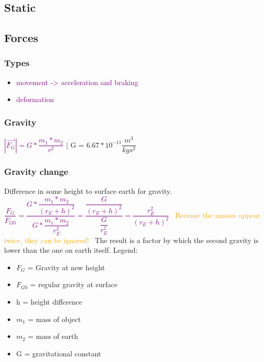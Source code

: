 \documentclass[main.tex,fontsize=8pt,paper=a4,paper=portrait,DIV=calc,]{scrartcl}
\begin{document}
\begin{multicols*}{2}
\section{Static}
\subsection{Forces}
\subsubsection{Types}
\vspace{2mm}
\begin{itemize}
\item \textcolor{purple}{movement -> acceleration and braking}
\item \textcolor{purple}{deformation}

\end{itemize}

\subsubsection{Gravity}
\textcolor{purple}{\( |\vec{F_G}| = G * \dfrac{m_1 * m_2}{r^2} \)} | 
G = \(6.67 * 10^{-11}\dfrac{m^3}{kgs^2}\)\vspace{2mm}

\subsubsection{Gravity change}
Difference in some height to surface earth for gravity.\newline
\, \newline
\large \textcolor{purple}{\( \dfrac{F_G}{F_{G0}} = \dfrac{G*\dfrac{m_1 * m_2}{(r_E + h)^2}}{G*\dfrac{m_1 * m_2}{r_E^2}} = \dfrac{\dfrac{G}{(r_E + h)^2}}{\dfrac{G}{r_E^2}}  = \dfrac{r_E^2}{(r_E + h)^2} \)}\newline
\, \newline
\textcolor{orange}{Because the masses appear twice, they can be ignored!}\newline
\, \newline
\normalsize The result is a factor by which the second gravity is lower than the one on earth itself.\newline
Legend: \newline
\begin{itemize}
  \item \(F_G\) = Gravity at new height
  \item \(F_{G0}\) = regular gravity at surface
\item h = height difference
\item \(m_1\) = mass of object 
\item \(m_2\) = mass of earth 
\item G = gravitational constant
\end{itemize} 


\end{multicols*}
\end{document}

